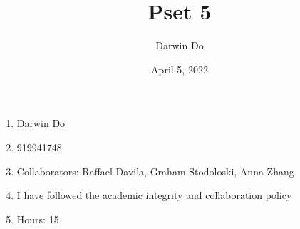 \documentclass{article}
\title{Pset 5}
\begin{document}
\newcommand{\Not}{\textbf{not}}
\newcommand{\AAnd}{\textbf{and}}
\newcommand{\Or}{\textbf{or}}
\newcommand{\True}{\texttt{True}}
\newcommand{\False}{\texttt{False}}

\date{April 5, 2022 }
\author{Darwin Do}

\maketitle

\begin{enumerate}
    \item Darwin Do
    \item 919941748
    \item Collaborators: Raffael Davila, Graham Stodoloski, Anna Zhang
    \item I have followed the academic integrity and collaboration policy
    \item Hours: 15
\end{enumerate}

\newpage
\end{document}
